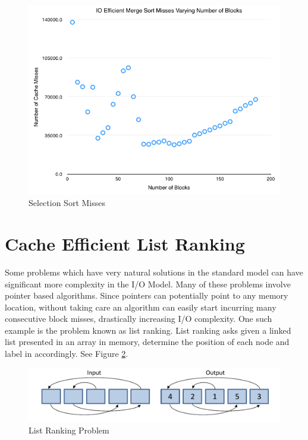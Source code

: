 \documentclass[11pt]{article}
\begin{document}
\begin{figure}[H]  
\includegraphics[scale=0.45]{figures/NumBlocks_IOEfficientMergeSort.png}
\caption{Selection Sort Misses}
\label{listrankingio}
\end{figure}


\section{Cache Efficient List Ranking}
Some problems which have very natural solutions in the standard model can have significant more complexity in the I/O Model. 
Many of these problems involve pointer based algorithms.  Since pointers can potentially point to any memory location, without 
taking care an algorithm can easily start incurring many consecutive block misses, drastically increasing I/O complexity.  One 
such example is the problem known as list ranking.  List ranking asks given a linked list presented in an array in memory, determine 
the position of each node and label in accordingly.  See Figure  \ref{listrankingio}.

\begin{figure}[H]  
\includegraphics[scale=0.5]{figures/listrankingio.pdf}
\caption{List Ranking Problem}
\label{listrankingio}
\end{figure}
\end{document}
